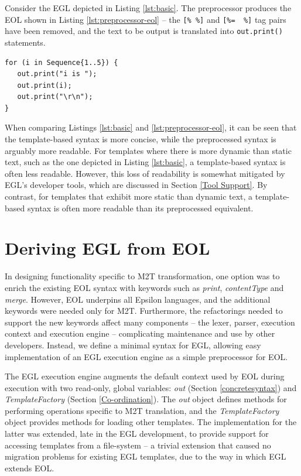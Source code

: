Consider the EGL depicted in Listing \ref{lst:basic}.  The
preprocessor produces the EOL
shown in Listing
\ref{lst:preprocessor-eol} -- the \verb|[% %]| and \verb|[%=  %]| tag pairs have been removed, and the text to be output is translated into \verb|out.print()| statements.

\begin{lstlisting}[basicstyle=\ttfamily\footnotesize, tabsize=2, flexiblecolumns=true, caption=Resulting EOL generated by the preprocessor., label=lst:preprocessor-eol]
for (i in Sequence{1..5}) {
   out.print("i is ");
   out.print(i);
   out.print("\r\n");
}
\end{lstlisting}

When comparing Listings \ref{lst:basic} and \ref{lst:preprocessor-eol}, it can be seen that the template-based syntax is more concise, while the preprocessed syntax is arguably more readable. For templates where there is more dynamic than static text, such as the one depicted in Listing \ref{lst:basic}, a template-based syntax is often less readable. However, this loss of readability is somewhat mitigated by EGL's developer tools, which are discussed in Section \ref{Tool Support}. By contrast, for templates that exhibit more static than dynamic text, a template-based syntax is often more readable than its preprocessed equivalent.

\section{Deriving EGL from EOL}

In designing functionality specific to M2T transformation, one option
was to 
enrich the existing EOL syntax with  keywords such as \emph{print}, \emph{contentType} 
and \emph{merge}.  However, EOL underpins all Epsilon
languages, and the additional keywords were needed only for M2T.
Furthermore, the refactorings needed to support the new keywords
affect many components -- the lexer, parser, execution context and
execution engine -- complicating maintenance and use by other developers.
Instead, we define a minimal syntax for EGL, allowing easy
implementation of an EGL execution engine as a simple preprocessor for EOL. 
 

The EGL execution engine augments the default context used by EOL
during execution with two read-only, global variables: \emph{out}
(Section \ref{concretesyntax}) and \emph{TemplateFactory} (Section
\ref{Co-ordination}). The \emph{out} object defines methods for
performing operations specific to M2T translation, and the
\emph{TemplateFactory} object provides methods for loading other
templates. The implementation for the latter was extended, late in the
EGL development, to provide support for accessing templates from a
file-system -- a trivial extension that caused no migration problems
for existing EGL templates, due to the way in which EGL extends EOL.

